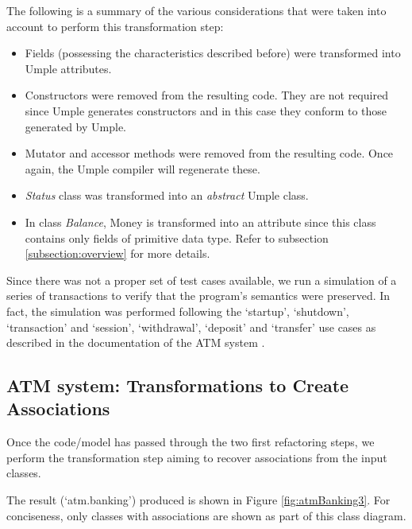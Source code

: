 The following is a summary of the various considerations that were taken into account to perform this transformation step:

\begin{itemize}
\item Fields (possessing the characteristics described before) were transformed into Umple attributes. 

\item Constructors were removed from the resulting code. They are not required since Umple generates constructors and in this case they conform to those generated by Umple. 

\item Mutator and accessor methods were removed from the resulting code. Once again, the Umple compiler will regenerate these. 

\item \textit{Status} class was transformed into an \textit{abstract} Umple class. 

\item In class \textit{Balance}, Money is transformed into an attribute since this class contains only fields of primitive data type. Refer to subsection \ref{subsection:overview} for more details.
\end{itemize}

Since there was not a proper set of test cases available, we run a simulation of a series of transactions to verify that the program's semantics were preserved. In fact, the simulation was performed following the  `startup', `shutdown', `transaction' and `session', `withdrawal', `deposit' and `transfer' use cases as described in the documentation of the ATM system \cite{atmsystem}.


\subsection{ATM system: Transformations to Create Associations}

Once the code/model has  passed through the two first refactoring steps, we perform the transformation step aiming to recover associations from the input classes.

The result (`atm.banking') produced is shown in Figure \ref{fig:atmBanking3}. For conciseness, only classes with associations are shown as part of this class diagram. 

